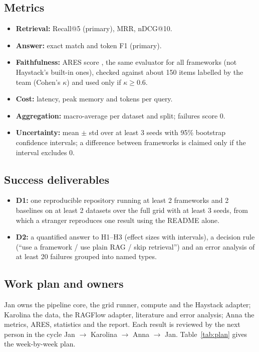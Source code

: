 \documentclass[11pt]{article}
\begin{document}
\subsection{Metrics}
\begin{itemize}
    \item \textbf{Retrieval:} Recall@5 (primary), MRR, nDCG@10.
    \item \textbf{Answer:} exact match and token F1 (primary).
    \item \textbf{Faithfulness:} ARES score \cite{ares}, the same evaluator for all frameworks (not Haystack's built-in ones), checked against about 150 items labelled by the team (Cohen's $\kappa$) and used only if $\kappa\ge0.6$.
    \item \textbf{Cost:} latency, peak memory and tokens per query.
    \item \textbf{Aggregation:} macro-average per dataset and split; failures score 0.
    \item \textbf{Uncertainty:} mean $\pm$ std over at least 3 seeds with 95\% bootstrap confidence intervals; a difference between frameworks is claimed only if the interval excludes 0.
\end{itemize}

\subsection{Success deliverables}
\begin{itemize}
    \item \textbf{D1:} one reproducible repository running at least 2 frameworks and 2 baselines on at least 2 datasets over the full grid with at least 3 seeds, from which a stranger reproduces one result using the README alone.
    \item \textbf{D2:} a quantified answer to H1--H3 (effect sizes with intervals), a decision rule (``use a framework / use plain RAG / skip retrieval'') and an error analysis of at least 20 failures grouped into named types.
\end{itemize}

\subsection{Work plan and owners}
Jan owns the pipeline core, the grid runner, compute and the Haystack adapter; Karolina the data, the RAGFlow adapter, literature and error analysis; Anna the metrics, ARES, statistics and the report. Each result is reviewed by the next person in the cycle Jan $\rightarrow$ Karolina $\rightarrow$ Anna $\rightarrow$ Jan. Table~\ref{tab:plan} gives the week-by-week plan.
\end{document}

